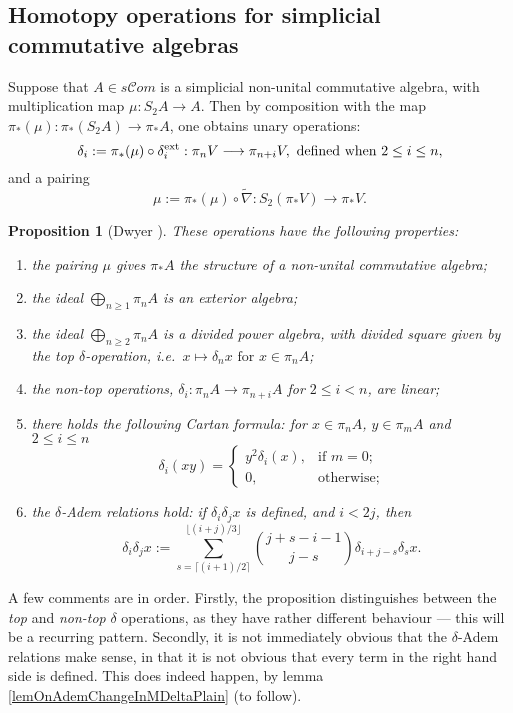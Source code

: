\documentclass[11pt]{amsart}
\theoremstyle{plain}
\newtheorem{prop}[thm]{Proposition}
\theoremstyle{definition}
\renewcommand{\to}{\longrightarrow}
\newcommand{\scrC}{\mathscr{C}}
\theoremstyle{plain}
\newcommand{\algs}{{\scrC\!\textit{om}}}
\begin{document}
\begin{Constructing (co)homotopy operations}
\subsection{Homotopy operations for simplicial commutative algebras}\label{Homotopy operations for simplicial commutative algebras}
Suppose that $A\in s \algs$ is a simplicial non-unital commutative algebra, with multiplication map $\mu:S_2A\to A$. Then by composition with the map $\pi_*(\mu):\pi_*(S_2A)\to \pi_*A$, one obtains unary operations:
\[\delta_i:=\pi_*(\mu)\circ\delta_i^\textup{ext}:\pi_nV\to \pi_{n+i}V,\textup{ defined when }2\leq i\leq n,\]
and a pairing\[\mu:=\pi_*(\mu)\circ\widetilde{\nabla}:S_2(\pi_*V)\to \pi_{*}V.\]
\begin{prop}[Dwyer {\cite{DwyerHtpyOpsSimpComAlg.pdf}}]\label{omnibus on htpy of simp algs}These operations have the following properties:
\begin{enumerate}
\item the pairing $\mu$ gives $\pi_*A$ the structure of a non-unital commutative algebra;
\item the ideal $\bigoplus_{n\geq1}\pi_nA$ is an exterior algebra;
\item the ideal $\bigoplus_{n\geq2}\pi_nA$ is a divided power algebra, with divided square given by the \emph{top} $\delta$-operation, i.e.\ $x\mapsto \delta_nx\text{ for }x\in\pi_nA$;
\item the \emph{non-top operations}, $\delta_i:\pi_nA\to \pi_{n+i}A$ for $2\leq i<n$, are linear;
\item there holds the following \emph{Cartan formula}: for $x\in\pi_nA$, $y\in \pi_mA$ and $2\leq i\leq n$
\[\delta_i(xy)=\begin{cases}
y^2\delta_i(x),&\text{if }m=0;\\
0,&\text{otherwise};
\end{cases}
\]
\item \label{deltaademsunstable} the \emph{$\delta$-Adem relations} hold: if $\delta_i\delta_jx$ is defined, and $i<2j$, then
\[\delta_i\delta_jx:=\sum_{s=\lceil(i+1)/2\rceil}^{\lfloor(i+j)/3\rfloor}{j+s-i-1\choose j-s}\delta_{i+j-s}\delta_sx.\]
\end{enumerate}
\end{prop}
A few comments are in order. Firstly, the proposition distinguishes between the \emph{top} and \emph{non-top} $\delta$ operations, as they have rather different behaviour --- this will be a recurring pattern. Secondly, it is not immediately obvious that the $\delta$-Adem relations make sense, in that it is not obvious that every term in the right hand side is defined. This does indeed happen, by lemma \ref{lemOnAdemChangeInMDeltaPlain} (to follow). 


\end{Constructing (co)homotopy operations}
\end{document}
